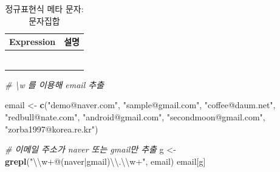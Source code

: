 \documentclass[
  11pt,
]{krantz}
\newenvironment{Shaded}{\begin{snugshade}}{\end{snugshade}}
\newcommand{\CharTok}[1]{\textcolor[rgb]{0.5,0.5,0.5}{#1}}
\newcommand{\CommentTok}[1]{\textcolor[rgb]{0.37,0.37,0.37}{\textit{#1}}}
\newcommand{\KeywordTok}[1]{\textcolor[rgb]{0.27,0.27,0.27}{\textbf{#1}}}
\newcommand{\NormalTok}[1]{#1}
\newcommand{\StringTok}[1]{\textcolor[rgb]{0.5,0.5,0.5}{#1}}
\begin{document}
\footnotesize

\begin{table}[H]

\caption{\label{tab:meta-char2}정규표현식 메타 문자: 문자집합}
\centering
\fontsize{10}{12}\selectfont
\begin{tabu} to 
\toprule
Expression & 설명\\
\midrule
{}   & \\
 & \\
   & \\
 & \\
   & \\
\addlinespace
{} & \\
\bottomrule
\end{tabu}
\end{table}

\normalsize

\footnotesize

\begin{Shaded}
\begin{Highlighting}[]
\CommentTok{# \textbackslash{}w 를 이용해 email 추출}

\NormalTok{email <-}\StringTok{ }\KeywordTok{c}\NormalTok{(}\StringTok{"demo@naver.com"}\NormalTok{, }
           \StringTok{"sample@gmail.com"}\NormalTok{, }
           \StringTok{"coffee@daum.net"}\NormalTok{, }
           \StringTok{"redbull@nate.com"}\NormalTok{, }
           \StringTok{"android@gmail.com"}\NormalTok{, }
           \StringTok{"secondmoon@gmail.com"}\NormalTok{, }
           \StringTok{"zorba1997@korea.re.kr"}\NormalTok{)}

\CommentTok{# 이메일 주소가 naver 또는 gmail만 추출}
\NormalTok{g <-}\StringTok{ }\KeywordTok{grepl}\NormalTok{(}\StringTok{"}\CharTok{\textbackslash{}\textbackslash{}}\StringTok{w+@(naver|gmail)}\CharTok{\textbackslash{}\textbackslash{}}\StringTok{.}\CharTok{\textbackslash{}\textbackslash{}}\StringTok{w+"}\NormalTok{, email)}
\NormalTok{email[g]}
\end{Highlighting}
\end{Shaded}
\end{document}
